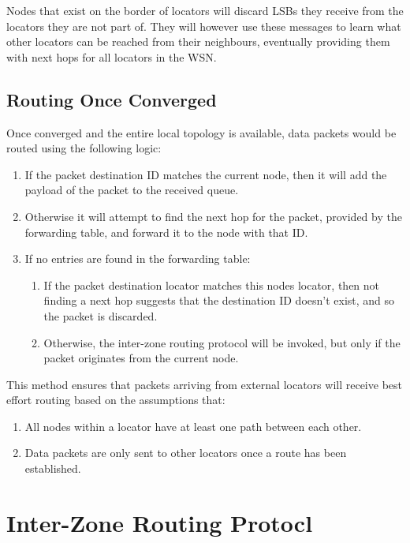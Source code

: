 \documentclass[12pt]{article}
\begin{document}
Nodes that exist on the border of locators will discard LSBs they receive from the locators they are not part of. They will however use these messages to learn what other locators can be reached from their neighbours, eventually providing them with next hops for all locators in the WSN.

\subsection{Routing Once Converged}

Once converged and the entire local topology is available, data packets would be routed using the following logic:

\begin{enumerate}
	\item If the packet destination ID matches the current node, then it will add the payload of the packet to the received queue. 
	\item Otherwise it will attempt to find the next hop for the packet, provided by the forwarding table, and forward it to the node with that ID. 
	\item If no entries are found in the forwarding table:
	\begin{enumerate}
		\item If the packet destination locator matches this nodes locator, then not finding a next hop suggests that the destination ID doesn't exist, and so the packet is discarded. 
		\item Otherwise, the inter-zone routing protocol will be invoked, but only if the packet originates from the current node. 
	\end{enumerate}
\end{enumerate}

This method ensures that packets arriving from external locators will receive best effort routing based on the assumptions that:

\begin{enumerate}
	\item All nodes within a locator have at least one path between each other. 
	\item Data packets are only sent to other locators once a route has been established.
\end{enumerate}

\section{Inter-Zone Routing Protocl}
\end{document}
